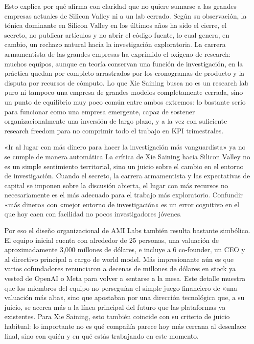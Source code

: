 Esto explica por qué afirma con claridad que no quiere sumarse a las grandes empresas actuales de Silicon Valley ni a un lab cerrado. Según su observación, la tónica dominante en Silicon Valley en los últimos años ha sido el cierre, el secreto, no publicar artículos y no abrir el código fuente, lo cual genera, en cambio, un rechazo natural hacia la investigación exploratoria. La carrera armamentista de las grandes empresas ha exprimido el oxígeno de research: muchos equipos, aunque en teoría conservan una función de investigación, en la práctica quedan por completo arrastrados por los cronogramas de producto y la disputa por recursos de cómputo. Lo que Xie Saining busca no es un research lab puro ni tampoco una empresa de grandes modelos completamente cerrada, sino un punto de equilibrio muy poco común entre ambos extremos: lo bastante serio para funcionar como una empresa emergente, capaz de sostener organizacionalmente una inversión de largo plazo, y a la vez con suficiente research freedom para no comprimir todo el trabajo en KPI trimestrales.

\begin{warningbox}{«Ir al lugar con más dinero para hacer la investigación más vanguardista» ya no se cumple de manera automática}
La crítica de Xie Saining hacia Silicon Valley no es un simple sentimiento territorial, sino un juicio sobre el cambio en el entorno de investigación. Cuando el secreto, la carrera armamentista y las expectativas de capital se imponen sobre la discusión abierta, el lugar con más recursos no necesariamente es el más adecuado para el trabajo más exploratorio. Confundir «más dinero» con «mejor entorno de investigación» es un error cognitivo en el que hoy caen con facilidad no pocos investigadores jóvenes.
\end{warningbox}

Por eso el diseño organizacional de AMI Labs también resulta bastante simbólico. El equipo inicial cuenta con alrededor de 25 personas, una valuación de aproximadamente 3,000 millones de dólares, e incluye a 6 co-founder, un CEO y al directivo principal a cargo de world model. Más impresionante aún es que varios cofundadores renunciaron a decenas de millones de dólares en stock ya vested de OpenAI o Meta para volver a sentarse a la mesa. Este detalle muestra que los miembros del equipo no perseguían el simple juego financiero de «una valuación más alta», sino que apostaban por una dirección tecnológica que, a su juicio, se acerca más a la línea principal del futuro que las plataformas ya existentes. Para Xie Saining, esto también coincide con su criterio de juicio habitual: lo importante no es qué compañía parece hoy más cercana al desenlace final, sino con quién y en qué estás trabajando en este momento.

